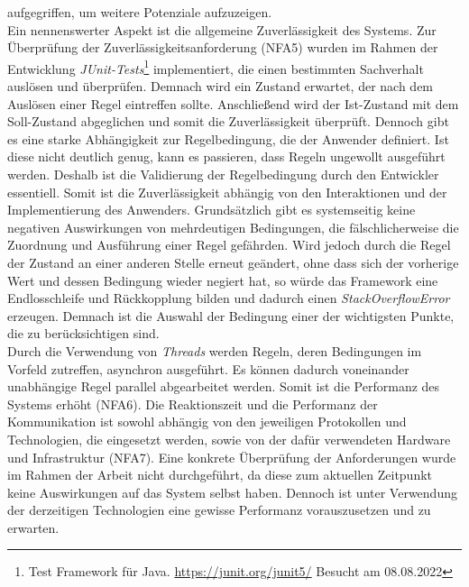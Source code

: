         aufgegriffen, um weitere Potenziale aufzuzeigen. 
        \\
        \linebreak
        Ein nennenswerter Aspekt ist die allgemeine Zuverlässigkeit des Systems. Zur Überprüfung der Zuverlässigkeitsanforderung (NFA5) wurden im Rahmen der 
        Entwicklung \textit{JUnit-Tests}\footnote{Test Framework für Java. \url{https://junit.org/junit5/} Besucht am 08.08.2022} implementiert, die 
        einen bestimmten Sachverhalt auslösen und überprüfen. Demnach wird ein Zustand erwartet, der nach dem Auslösen einer Regel eintreffen sollte. Anschließend 
        wird der Ist-Zustand mit dem Soll-Zustand abgeglichen und somit die Zuverlässigkeit überprüft. 
        Dennoch gibt es eine starke Abhängigkeit zur Regelbedingung, die der Anwender definiert. Ist diese 
        nicht deutlich genug, kann es passieren, dass Regeln ungewollt ausgeführt werden. Deshalb ist die Validierung der Regelbedingung durch den 
        Entwickler essentiell. Somit ist die Zuverlässigkeit abhängig von den Interaktionen und der Implementierung des Anwenders. Grundsätzlich gibt es 
        systemseitig keine negativen Auswirkungen von mehrdeutigen Bedingungen, die fälschlicherweise die Zuordnung und Ausführung einer Regel gefährden. Wird jedoch durch die 
        Regel der Zustand an einer anderen Stelle erneut geändert, ohne dass sich der vorherige Wert und dessen Bedingung wieder negiert hat, so würde das 
        Framework eine Endlosschleife und Rückkopplung bilden und dadurch einen \textit{StackOverflowError} erzeugen. Demnach ist die Auswahl der Bedingung einer der wichtigsten 
        Punkte, die zu berücksichtigen sind.
        \\
        \linebreak
        Durch die Verwendung von \textit{Threads} werden Regeln, deren Bedingungen im Vorfeld zutreffen, asynchron ausgeführt. Es können dadurch voneinander 
        unabhängige Regel parallel abgearbeitet werden. Somit ist die Performanz des Systems erhöht (NFA6). Die Reaktionszeit und die Performanz der 
        Kommunikation ist sowohl abhängig von den jeweiligen Protokollen und Technologien, die eingesetzt werden, sowie von der dafür verwendeten Hardware 
        und Infrastruktur (NFA7). Eine konkrete Überprüfung der Anforderungen wurde im Rahmen der Arbeit nicht durchgeführt, da diese zum aktuellen Zeitpunkt keine 
        Auswirkungen auf das System selbst haben. Dennoch ist unter Verwendung der derzeitigen Technologien eine gewisse Performanz vorauszusetzen und zu erwarten. 
